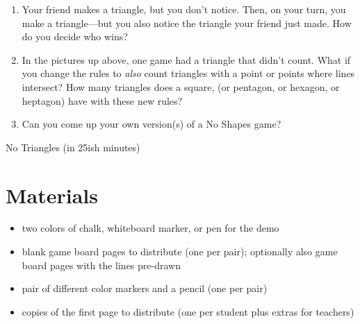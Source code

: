 \documentclass{article}
\begin{document}
\begin{enumerate}
        \item Your friend makes a triangle, but you don't notice. Then, on your turn, you make a triangle---but you also notice the triangle your friend just made. How do you decide who wins?
        \item In the pictures up above, one game had a triangle that didn't count. What if you change the rules to \textit{also} count triangles with a point or points where lines intersect? How many triangles does a square, (or pentagon, or hexagon, or heptagon) have with these new rules?
        \item Can you come up your own version(s) of a No Shapes game?
    \end{enumerate}

    \clearpage
    \begin{multicols}{2}
        \begin{center}
            
            \vfill
            \hrulefill
            \vfill
            
            \vfill
            \hrulefill
            \vfill
            
        \columnbreak
            
            \vfill
            \hrulefill
            \vfill
            
            \vfill
            \hrulefill
            \vfill
            
        \clearpage
            
            \vfill
            \hrulefill
            \vfill
            
            \vfill
            \hrulefill
            \vfill
            
        \columnbreak
            
            \vfill
            \hrulefill
            \vfill
            
            \vfill
            \hrulefill
            \vfill
            
        \clearpage
        \end{center}
    \end{multicols}

    \begin{Huge}
        No Triangles (in 25ish minutes)
    \end{Huge}

    \hrulefill 

    \section{Materials}
        \begin{itemize}
            \item two colors of chalk, whiteboard marker, or pen for the demo
            \item blank game board pages to distribute (one per pair); optionally also game board pages with the lines pre-drawn
            \item pair of different color markers and a pencil (one per pair)
            \item copies of the first page to distribute (one per student plus extras for teachers)
        \end{itemize}
\end{document}
